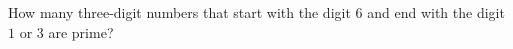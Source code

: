 How many three-digit numbers that start with the digit $6$ and end with the digit $1$ or $3$ are prime?
